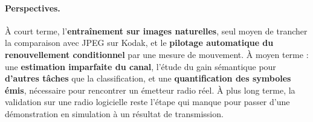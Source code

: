 \paragraph{Perspectives.} À court terme, l'\textbf{entraînement sur images naturelles}, seul moyen de
trancher la comparaison avec JPEG sur Kodak, et le \textbf{pilotage automatique du renouvellement
conditionnel} par une mesure de mouvement. À moyen terme : une \textbf{estimation imparfaite du canal},
l'étude du gain sémantique pour \textbf{d'autres tâches} que la classification, et une \textbf{quantification
des symboles émis}, nécessaire pour rencontrer un émetteur radio réel. À plus long terme, la validation sur
une radio logicielle reste l'étape qui manque pour passer d'une démonstration en simulation à un résultat de
transmission.
